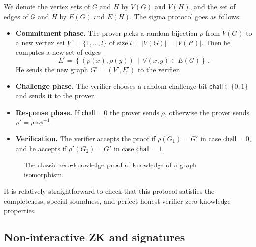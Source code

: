 \documentclass{llncs}
\newcommand{\chall}{\mathsf{chall}}
\begin{document}
We denote the vertex sets of $G$ and $H$ by $V(G)$ and $V(H)$, and the set of edges of $G$ and $H$ by $E(G)$ and $E(H)$. The sigma protocol goes as follows:

\begin{itemize}
    \item {\bf Commitment phase.} The prover picks a random bijection $\rho$ from $V(G)$ to a new vertex set $V' = \{1,\dots,l\}$ of size $l = |V(G)| = |V(H)|$. Then he computes a new set of edges \[ E' = \left\{ (\rho(x),\rho(y)) \, \middle| \, \forall (x,y) \in E(G) \right\} \, . \] He sends the new graph $G' = (V',E')$ to the verifier.
    \item {\bf Challenge phase.} The verifier chooses a random challenge bit $\chall \in \{0,1\}$ and sends it to the prover.
    \item {\bf Response phase.} If $\chall = 0$ the prover sends $\rho$, otherwise the prover sends $\rho' = \rho \circ \phi^{-1}$. 
    \item {\bf Verification.} The verifier accepts the proof if $\rho(G_1) = G'$ in case $\chall = 0$, and he accepts if $\rho'(G_2) = G'$ in case $\chall = 1$. 
\end{itemize}

\begin{figure}
    \begin{center}
        \caption[Zero-Knowledge protocol for graph isomorphism]{%
          The classic zero-knowledge proof of knowledge of a graph isomorphism.
        }
        \label{fig:idscheme}
    \end{center}
\end{figure}

It is relatively straightforward to check that this protocol satisfies the completeness, special soundness, and perfect honest-verifier zero-knowledge properties.


\subsection{Non-interactive ZK and signatures}
\end{document}
